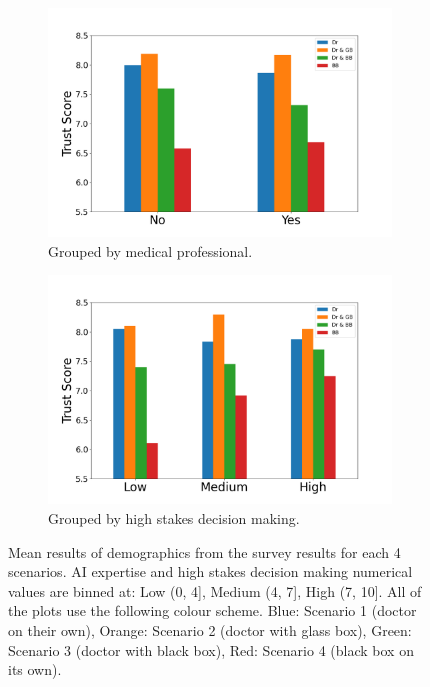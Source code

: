 \documentclass[manuscript,screen,review]{acmart}
\begin{document}
\begin{figure}[ht]
  \medskip
  \begin{subfigure}[t]{.45\textwidth}
    \centering
    \includegraphics[width=\linewidth]{graphics/survey_averages/survey_medics_grouped.png}
    \caption{Grouped by medical professional.}
  \end{subfigure}
  \begin{subfigure}[t]{.45\textwidth}
    \centering
    \includegraphics[width=\linewidth]{graphics/survey_averages/survey_stakes_grouped.png}
    \caption{Grouped by high stakes decision making.}
    \label{subfig:high stakes}
  \end{subfigure}
  \caption{Mean results of demographics from the survey results for each 4 scenarios. AI expertise and high stakes decision making numerical values are binned at: Low (0, 4], Medium (4, 7], High (7, 10]. All of the plots use the following colour scheme. Blue: Scenario 1 (doctor on their own), Orange: Scenario 2 (doctor with glass box), Green: Scenario 3 (doctor with black box), Red: Scenario 4 (black box on its own).}
  \label{fig:mean_survey_results}
\end{figure}
\end{document}
